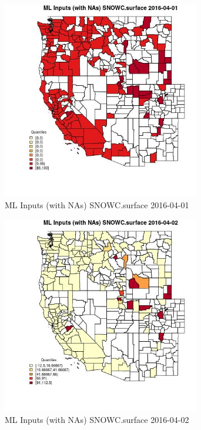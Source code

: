 \begin{figure} 
\centering  
\includegraphics[width=0.77\textwidth]{Code_Outputs/Report_ML_input_PM25_Step4_part_e_de_duplicated_aveswNAs_CountySNOWCsurfaceMean2016-04-01_2016-04-01.jpg} 
\caption{\label{fig:Report_ML_input_PM25_Step4_part_e_de_duplicated_aveswNAsCountySNOWCsurfaceMean2016-04-01_2016-04-01}ML Inputs (with NAs) SNOWC.surface 2016-04-01} 
\end{figure} 
 

\begin{figure} 
\centering  
\includegraphics[width=0.77\textwidth]{Code_Outputs/Report_ML_input_PM25_Step4_part_e_de_duplicated_aveswNAs_CountySNOWCsurfaceMean2016-04-02_2016-04-02.jpg} 
\caption{\label{fig:Report_ML_input_PM25_Step4_part_e_de_duplicated_aveswNAsCountySNOWCsurfaceMean2016-04-02_2016-04-02}ML Inputs (with NAs) SNOWC.surface 2016-04-02} 
\end{figure} 
 

